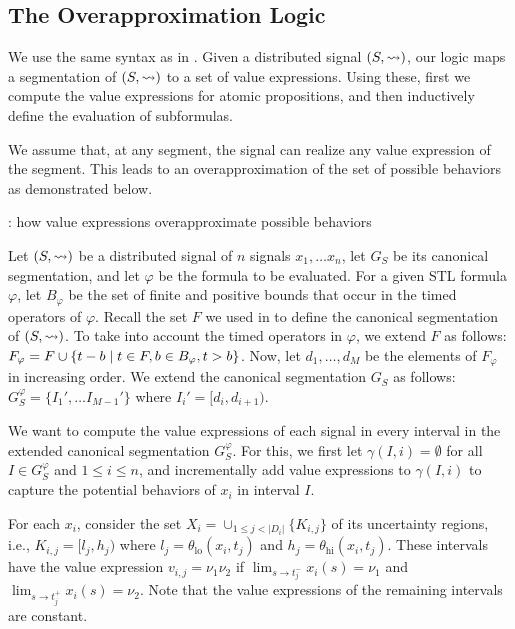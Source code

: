 %

\subsection{The Overapproximation Logic}
We use the same syntax as in .
Given a distributed signal $(S,{\rightsquigarrow})$, our logic maps a segmentation of $(S,{\rightsquigarrow})$ to a set of value expressions.
Using these, first we compute the value expressions for atomic propositions, and then inductively define the evaluation of subformulas.

We assume that, at any segment, the signal can realize any value expression of the segment.
This leads to an overapproximation of the set of possible behaviors as demonstrated below.

\begin{example}
	\TODO: how value expressions overapproximate possible behaviors
\end{example}

Let $(S,{\rightsquigarrow})$ be a distributed signal of $n$ signals $x_1, \ldots x_n$, let $G_S$ be its canonical segmentation, and let $\varphi$ be the formula to be evaluated.
For a given STL formula $\varphi$, let $B_\varphi$ be the set of finite and positive bounds that occur in the timed operators of $\varphi$.
Recall the set $F$ we used in  to define the canonical segmentation of $(S,{\rightsquigarrow})$.
To take into account the timed operators in $\varphi$, we extend $F$ as follows:
$F_\varphi = F \cup \{t - b \st t \in F, b \in B_\varphi, t > b\}$.
Now, let $d_1, \ldots, d_M$ be the elements of $F_\varphi$ in increasing order.
We extend the canonical segmentation $G_S$ as follows:
$G_S^\varphi = \{I_1', \ldots I_{M-1}'\}$ where $I_i' = [d_i, d_{i+1})$.

We want to compute the value expressions of each signal in every interval in the extended canonical segmentation $G_S^\varphi$.
For this, we first let $\gamma(I, i) = \emptyset$ for all $I \in G_S^\varphi$ and $1 \leq i \leq n$, and incrementally add value expressions to $\gamma(I, i)$ to capture the potential behaviors of $x_i$ in interval $I$.

For each $x_i$, consider the set $X_i = \cup_{1 \leq j < |D_i|} \{K_{i,j}\}$ of its uncertainty regions, i.e.,  $K_{i,j} = [l_j, h_j)$ where $l_j = \theta_{\text{lo}}(x_i, t_j)$ and $h_j = \theta_{\text{hi}}(x_i, t_j)$.
These intervals have the value expression $v_{i,j} = \nu_1 \nu_2$ if $\lim_{s \to t_j^-} x_i(s) = \nu_1$ and $\lim_{s \to t_j^+} x_i(s) = \nu_2$.
Note that the value expressions of the remaining intervals are constant.

